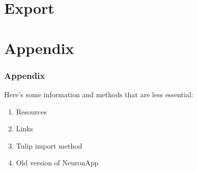 \documentclass[11pt]{beamer}
\begin{document}
\section{Export}
\section{Appendix}
\begin{frame}
	\frametitle{Appendix}
	Here's some information and methods that are less essential:
	\begin{enumerate}
		\item Resources
		\item Links
		\item Tulip import method
		\item Old version of NeuronApp
	\end{enumerate}
\end{frame}
\end{document}
